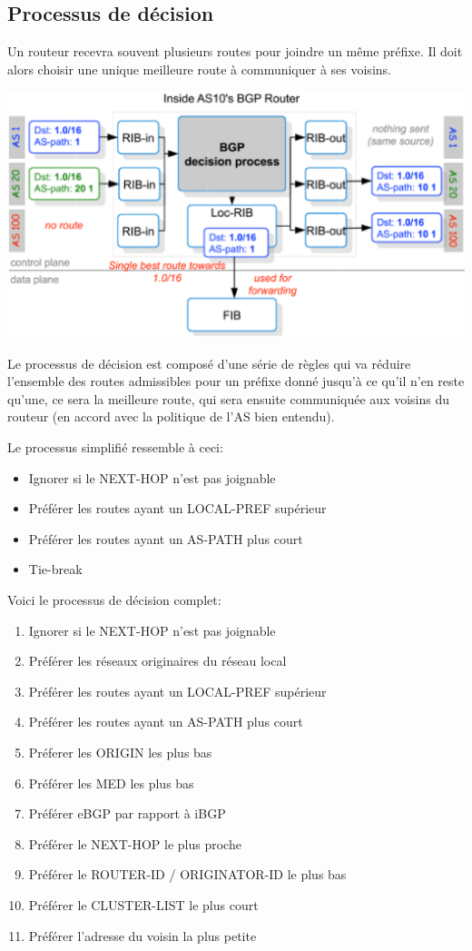 \documentclass{report}
\begin{document}
\subsection{Processus de décision}

Un routeur recevra souvent plusieurs routes pour joindre un même
préfixe. Il doit alors choisir une unique meilleure route à
communiquer à ses voisins.

\includegraphics[width=\textwidth]{decisionprocess.eps}

Le processus de décision est composé d'une série de règles qui va
réduire l'ensemble des routes admissibles pour un préfixe donné
jusqu'à ce qu'il n'en reste qu'une, ce sera la meilleure route, qui
sera ensuite communiquée aux voisins du routeur (en accord avec la
politique de l'AS bien entendu).

Le processus simplifié ressemble à ceci:

\begin{itemize}
\item Ignorer si le NEXT-HOP n'est pas joignable
\item Préférer les routes ayant un LOCAL-PREF supérieur
\item Préférer les routes ayant un AS-PATH plus court
\item Tie-break
\end{itemize}

Voici le processus de décision complet:

\begin{enumerate}
\item Ignorer si le NEXT-HOP n'est pas joignable
\item Préférer les réseaux originaires du réseau local
\item Préférer les routes ayant un LOCAL-PREF supérieur
\item Préférer les routes ayant un AS-PATH plus court
\item Préferer les ORIGIN les plus bas
\item Préférer les MED les plus bas
\item Préférer eBGP par rapport à iBGP
\item Préférer le NEXT-HOP le plus proche
\item Préférer le ROUTER-ID / ORIGINATOR-ID le plus bas
\item Préférer le CLUSTER-LIST le plus court
\item Préférer l'adresse du voisin la plus petite
\end{enumerate}
\end{document}
